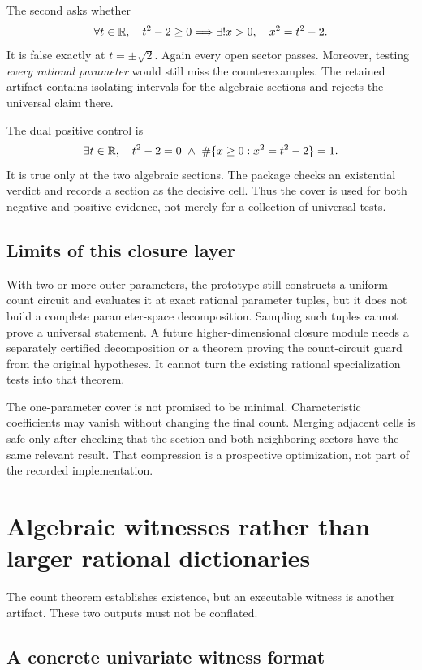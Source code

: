 The second asks whether
\[
\forall t\in\mathbb R,\quad t^2-2\geq0\Longrightarrow
\exists!x>0,\quad x^2=t^2-2.
\]
It is false exactly at $t=\pm\sqrt2$. Again every open sector passes. Moreover, testing \emph{every rational parameter} would still miss the counterexamples. The retained artifact contains isolating intervals for the algebraic sections and rejects the universal claim there.

The dual positive control is
\[
\exists t\in\mathbb R,\quad t^2-2=0\ \wedge\
\#\{x\geq0:x^2=t^2-2\}=1.
\]
It is true only at the two algebraic sections. The package checks an existential verdict and records a section as the decisive cell. Thus the cover is used for both negative and positive evidence, not merely for a collection of universal tests.

\subsection{Limits of this closure layer}

With two or more outer parameters, the prototype still constructs a uniform count circuit and evaluates it at exact rational parameter tuples, but it does not build a complete parameter-space decomposition. Sampling such tuples cannot prove a universal statement. A future higher-dimensional closure module needs a separately certified decomposition or a theorem proving the count-circuit guard from the original hypotheses. It cannot turn the existing rational specialization tests into that theorem.

The one-parameter cover is not promised to be minimal. Characteristic coefficients may vanish without changing the final count. Merging adjacent cells is safe only after checking that the section and both neighboring sectors have the same relevant result. That compression is a prospective optimization, not part of the recorded implementation.

\section{Algebraic witnesses rather than larger rational dictionaries}\label{sec:witness}

The count theorem establishes existence, but an executable witness is another artifact. These two outputs must not be conflated.

\subsection{A concrete univariate witness format}

